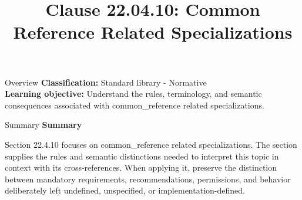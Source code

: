 \documentclass[10pt,letterpaper]{article}
\title{Clause 22.04.10: Common Reference Related Specializations}
\author{}
\date{}
\begin{document}
\maketitle
\begin{CornellOverviewBox}{Overview}
\textbf{Classification:} Standard library - Normative\\[2pt]
\textbf{Learning objective:} Understand the rules, terminology, and semantic consequences associated with common\_reference related specializations.
\end{CornellOverviewBox}\begin{CornellSummaryBox}{Summary}
{\sffamily\bfseries\color{Accent} Summary}\par\vspace{3pt}Section 22.4.10 focuses on common\_reference related specializations. The section supplies the rules and semantic distinctions needed to interpret this topic in context with its cross-references. When applying it, preserve the distinction between mandatory requirements, recommendations, permissions, and behavior deliberately left undefined, unspecified, or implementation-defined.
\end{CornellSummaryBox}
\end{document}
